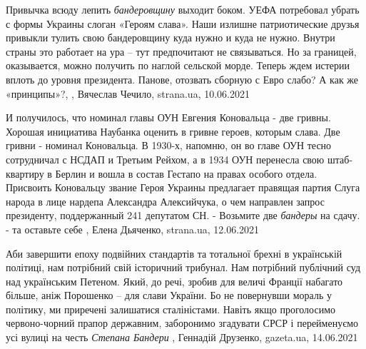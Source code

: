 Привычка всюду лепить \emph{бандеровщину} выходит боком.  УЕФА потребовал
убрать с формы Украины слоган «Героям слава».  Наши излишне патриотические
друзья привыкли тулить свою бандеровщину куда нужно и куда не нужно. Внутри
страны это работает на ура – тут предпочитают не связываться. Но за границей,
оказывается, можно получить по наглой сельской морде. Теперь ждем истерии
вплоть до уровня президента.  Панове, отозвать сборную с Евро слабо? А как же
«принципы»?,
, 
Вячеслав Чечило, strana.ua, 10.06.2021

И получилось, что номинал главы ОУН Евгения Коновальца - две гривны.  Хорошая
инициатива Наубанка оценить в гривне героев, которым слава. Две гривни -
номинал Коновальца. В 1930-х, напомню, он во главе ОУН тесно сотрудничал с
НСДАП и Третьим Рейхом, а в 1934 ОУН перенесла свою штаб-квартиру в Берлин и
вошла в состав Гестапо на правах особого отдела. Присвоить Коновальцу звание
Героя Украины предлагает правящая партия Слуга народа в лице нардепа Александра
Алексийчука, о чем направлен запрос президенту, поддержанный 241 депутатом СН.
- Возьмите две \emph{бандеры} на сдачу. - та оставьте себе
, 
Елена Дьяченко, strana.ua, 12.06.2021

Аби завершити епоху подвійних стандартів та тотальної брехні в українській
політиці, нам потрібний свій історичний трибунал. Нам потрібний публічний суд
над українським Петеном. Який, до речі, зробив для величі Франції набагато
більше, аніж Порошенко – для слави України.  Бо не повернувши мораль у
політику, ми приречені залишатися сталіністами. Навіть якщо проголосимо
червоно-чорний прапор державним, заборонимо згадувати СРСР і перейменуємо усі
вулиці на честь \emph{Степана Бандери}
, 
Геннадій Друзенко, gazeta.ua, 14.06.2021

